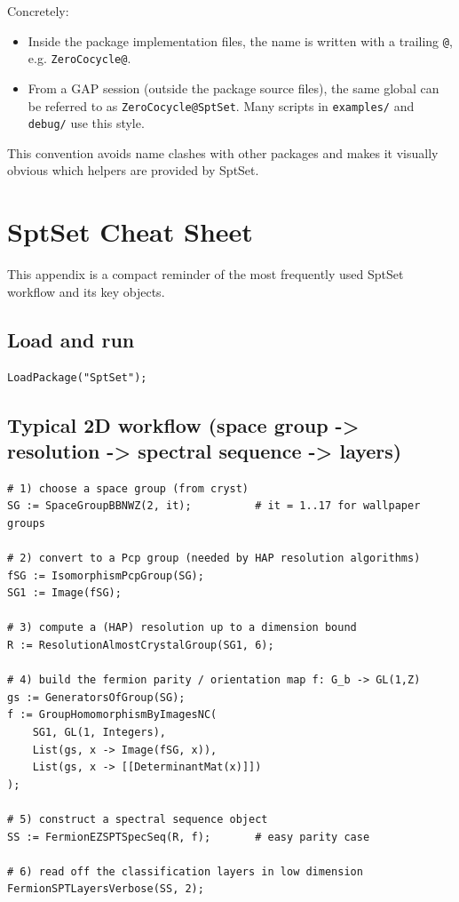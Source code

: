 \documentclass{SciPost}
\begin{document}
Concretely:
\begin{itemize}
    \item Inside the package implementation files, the name is written with a trailing \texttt{@}, e.g. \texttt{ZeroCocycle@}.
    \item From a GAP session (outside the package source files), the same global can be referred to as \texttt{ZeroCocycle@SptSet}. Many scripts in \texttt{examples/} and \texttt{debug/} use this style.
\end{itemize}

This convention avoids name clashes with other packages and makes it visually obvious which helpers are provided by SptSet.

\section{SptSet Cheat Sheet}
\label{app:sptset-cheat-sheet}

This appendix is a compact reminder of the most frequently used SptSet workflow and its key objects.

\subsection{Load and run}

\begin{verbatim}
LoadPackage("SptSet");
\end{verbatim}

\subsection{Typical 2D workflow (space group -> resolution -> spectral sequence -> layers)}

\begin{verbatim}
# 1) choose a space group (from cryst)
SG := SpaceGroupBBNWZ(2, it);          # it = 1..17 for wallpaper groups

# 2) convert to a Pcp group (needed by HAP resolution algorithms)
fSG := IsomorphismPcpGroup(SG);
SG1 := Image(fSG);

# 3) compute a (HAP) resolution up to a dimension bound
R := ResolutionAlmostCrystalGroup(SG1, 6);

# 4) build the fermion parity / orientation map f: G_b -> GL(1,Z)
gs := GeneratorsOfGroup(SG);
f := GroupHomomorphismByImagesNC(
    SG1, GL(1, Integers),
    List(gs, x -> Image(fSG, x)),
    List(gs, x -> [[DeterminantMat(x)]])
);

# 5) construct a spectral sequence object
SS := FermionEZSPTSpecSeq(R, f);       # easy parity case

# 6) read off the classification layers in low dimension
FermionSPTLayersVerbose(SS, 2);
\end{verbatim}
\end{document}
